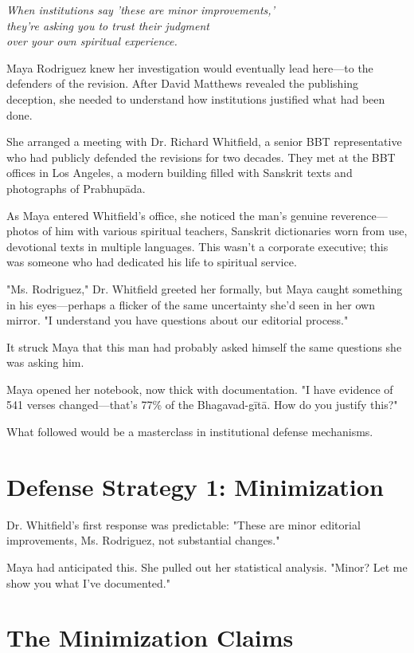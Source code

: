 \documentclass[11pt,twoside]{book}
\begin{document}
{\centering\itshape When institutions say 'these are minor improvements,'\\they're asking you to trust their judgment\\over your own spiritual experience.\par}
\vspace{0.3cm}

\normalfont\justifying
Maya Rodriguez knew her investigation would eventually lead here—to the defenders of the revision. After David Matthews revealed the publishing deception, she needed to understand how institutions justified what had been done.

She arranged a meeting with Dr. Richard Whitfield, a senior BBT representative who had publicly defended the revisions for two decades. They met at the BBT offices in Los Angeles, a modern building filled with Sanskrit texts and photographs of Prabhupāda.

As Maya entered Whitfield's office, she noticed the man's genuine reverence—photos of him with various spiritual teachers, Sanskrit dictionaries worn from use, devotional texts in multiple languages. This wasn't a corporate executive; this was someone who had dedicated his life to spiritual service.

"Ms. Rodriguez," Dr. Whitfield greeted her formally, but Maya caught something in his eyes—perhaps a flicker of the same uncertainty she'd seen in her own mirror. "I understand you have questions about our editorial process."

It struck Maya that this man had probably asked himself the same questions she was asking him.

Maya opened her notebook, now thick with documentation. "I have evidence of 541 verses changed—that's 77\% of the Bhagavad-gītā. How do you justify this?"

What followed would be a masterclass in institutional defense mechanisms.
\section*{Defense Strategy 1: Minimization}
\label{sec:orgeca050e}

Dr. Whitfield's first response was predictable: "These are minor editorial improvements, Ms. Rodriguez, not substantial changes."

Maya had anticipated this. She pulled out her statistical analysis. "Minor? Let me show you what I've documented."
\section*{The Minimization Claims}
\label{sec:orgf226dd6}
\end{document}
